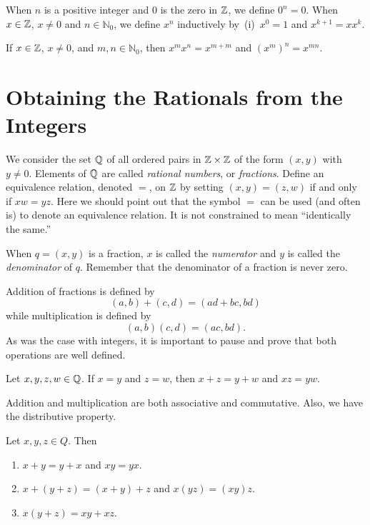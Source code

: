 When $n$ is a positive integer and $0$ is the zero in $\mathbb{Z}$, we
define $0^n=0$.  When $x\in\mathbb{Z}$, $x\neq 0$ and $n\in\mathbb{N}_0$,
we define $x^n$ inductively by~(i)~$x^0=1$ and $x^{k+1}=xx^k$.

\begin{theorem}
If $x\in\mathbb{Z}$, $x\neq0$, and $m,n\in\mathbb{N}_0$, then
$x^mx^n=x^{m+m}$ and $(x^m)^n=x^{mn}$.
\end{theorem}

\section{Obtaining the Rationals from the Integers}\label{s:background:rationals}

We consider the set $\mathbb{Q}$ of all ordered pairs in $\mathbb{Z}\times \mathbb{Z}$ of
the form $(x,y)$ with $y\neq 0$. Elements of $\mathbb{Q}$ are called
\textit{rational numbers}, or \textit{fractions}.  Define
an equivalence relation, denoted $=$, on $\mathbb{Z}$ by
setting $(x,y)=(z,w)$ if and only if $xw=yz$.  Here we
should point out that the symbol $=$ can be used (and often is)
to denote an equivalence relation. It is not constrained to mean ``identically
the same.''
  
When $q=(x,y)$ is a fraction, $x$ is called the \textit{numerator}
and $y$ is called the \textit{denominator} of $q$.  
Remember that the denominator of a fraction is never zero.

Addition of fractions is defined by 
\[
(a,b)+(c,d) = (ad+bc,bd)
\]
while multiplication is defined by
\[
(a,b)(c,d) = (ac,bd).
\]
As was the case with integers, it is important to pause
and prove that both operations are well defined.

\begin{theorem}
Let $x,y,z,w\in\mathbb{Q}$.
If $x=y$ and $z=w$, then $x+z=y+w$ and $xz=yw$.
\end{theorem} 

Addition and multiplication are both associative and commutative. 
Also, we have the distributive property.

\begin{theorem}
Let $x,y,z\in Q$.  Then
\begin{enumerate}
\item $x+y=y+x$ and $xy=yx$.
\item $x+(y+z) = (x+y)+z$ and $x(yz)=(xy)z$.
\item $x(y+z)=xy+xz$.
\end{enumerate}
\end{theorem}

